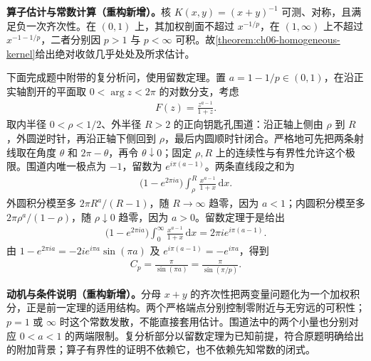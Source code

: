 \documentclass[../../main.tex]{subfiles}
\begin{document}
\begin{solution}
\textbf{算子估计与常数计算（重构新增）。}核 $K(x,y)=(x+y)^{-1}$ 可测、对称，且满足负一次齐次性。在 $(0,1)$ 上，其加权剖面不超过 $x^{-1/p}$，在 $(1,\infty)$ 上不超过 $x^{-1-1/p}$，二者分别因 $p>1$ 与 $p<\infty$ 可积。故\cref{theorem:ch06-homogeneous-kernel}给出绝对收敛几乎处处及所求估计。

下面完成题中附带的复分析问，使用留数定理。置 $a=1-1/p\in(0,1)$，在沿正实轴割开的平面取 $0<\arg z<2\pi$ 的对数分支，考虑
\begin{align*}
F(z)=\frac{z^{a-1}}{1+z}.
\end{align*}
取内半径 $0<\rho<1/2$、外半径 $R>2$ 的正向钥匙孔围道：沿正轴上侧由 $\rho$ 到 $R$，外圆逆时针，再沿正轴下侧回到 $\rho$，最后内圆顺时针闭合。严格地可先把两条射线取在角度 $\theta$ 和 $2\pi-\theta$，再令 $\theta\downarrow0$；固定 $\rho,R$ 上的连续性与有界性允许这个极限。围道内唯一极点为 $-1$，留数为 $e^{i\pi(a-1)}$。两条直线段之和为
\begin{align*}
\bigl(1-e^{2\pi ia}\bigr)\int_\rho^R\frac{x^{a-1}}{1+x}\,\mathrm dx.
\end{align*}
外圆积分模至多 $2\pi R^a/(R-1)$，随 $R\to\infty$ 趋零，因为 $a<1$；内圆积分模至多 $2\pi\rho^a/(1-\rho)$，随 $\rho\downarrow0$ 趋零，因为 $a>0$。留数定理于是给出
\begin{align*}
\bigl(1-e^{2\pi ia}\bigr)\int_0^\infty\frac{x^{a-1}}{1+x}\,\mathrm dx
=2\pi i e^{i\pi(a-1)}.
\end{align*}
由 $1-e^{2\pi ia}=-2i e^{i\pi a}\sin(\pi a)$ 及 $e^{i\pi(a-1)}=-e^{i\pi a}$，得到
\begin{align*}
C_p=\frac{\pi}{\sin(\pi a)}=\frac{\pi}{\sin(\pi/p)}.
\end{align*}
\end{solution}
\begin{remark}
\textbf{动机与条件说明（重构新增）。}分母 $x+y$ 的齐次性把两变量问题化为一个加权积分，正是前一定理的适用结构。两个严格端点分别控制零附近与无穷远的可积性；$p=1$ 或 $\infty$ 时这个常数发散，不能直接套用估计。围道法中的两个小量也分别对应 $0<a<1$ 的两端限制。复分析部分以留数定理为已知前提，符合原题明确给出的附加背景；算子有界性的证明不依赖它，也不依赖先知常数的闭式。
\end{remark}
\end{document}
